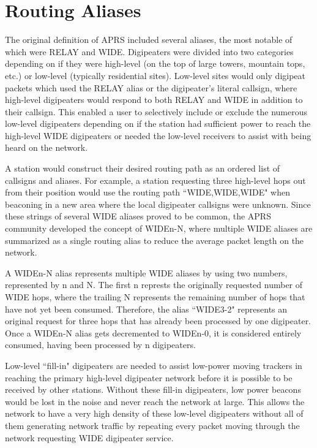 \section{Routing Aliases}

The original definition of APRS included several aliases,
the most notable of which were RELAY and WIDE.
Digipeaters were divided into two categories depending on if they were high-level
(on the top of large towers, mountain tops, etc.)
or low-level (typically residential sites).
Low-level sites would only digipeat packets which used the RELAY alias
or the digipeater's literal callsign,
where high-level digipeaters would respond to both RELAY and WIDE in addition
to their callsign.
This enabled a user to selectively include or exclude the numerous low-level
digipeaters depending on if the station had sufficient power to
reach the high-level WIDE digipeaters or needed the low-level receivers
to assist with being heard on the network.

A station would construct their desired routing path as an ordered list
of callsigns and aliases.
For example, a station requesting three high-level hops out from their position
would use the routing path ``WIDE,WIDE,WIDE" when beaconing in a new area where
the local digipeater callsigns were unknown.
Since these strings of several WIDE aliases proved to be common,
the APRS community developed the concept of WIDEn-N, where multiple
WIDE aliases are summarized as a single routing alias to reduce the average
packet length on the network.

A WIDEn-N alias represents multiple WIDE aliases by using two numbers,
represented by n and N.
The first n represts the originally requested number of WIDE hops,
where the trailing N represents the remaining number of hops that have not yet
been consumed.
Therefore, the alias ``WIDE3-2" represents an original request for three hops
that has already been processed by one digipeater.
Once a WIDEn-N alias gets decremented to WIDEn-0, it is considered entirely
consumed, having been processed by n digipeaters.

Low-level ``fill-in" digipeaters are needed to assist low-power 
moving trackers in reaching the primary high-level digipeater network
before it is possible to be received by other stations.
Without these fill-in digipeaters, 
low power beacons would be lost in the noise and never reach the network at large.
This allows the network to have a very high density of these low-level
digipeaters without all of them generating network traffic by repeating every
packet moving through the network requesting WIDE digipeater service.

